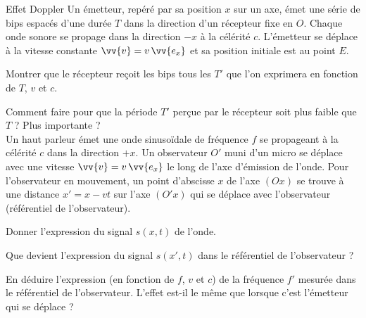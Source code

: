 \begin{exo}[PCSI]{Effet Doppler}
Un émetteur, repéré par sa position $x$ sur un axe, émet une série de bips espacés d'une durée $T$ dans la direction d'un récepteur fixe en $O$. Chaque onde sonore se propage dans la direction $-x$ à la célérité $c$. L'émetteur se déplace à la vitesse constante $\vv{v}=v\,\vv{e_x}$ et sa position initiale est au point $E$.
\begin{quest}
\item Montrer que le récepteur reçoit les bips tous les $T'$ que l'on exprimera en fonction de $T$, $v$ et $c$.

\item Comment faire pour que la période $T'$ perçue par le récepteur soit plus faible que $T$ ? Plus importante ?\\

Un haut parleur émet une onde sinusoïdale de fréquence $f$ se propageant à la célérité $c$ dans la direction $+x$. Un observateur $O'$ muni d'un micro se déplace avec une vitesse $\vv{v}=v\,\vv{e_x}$ le long de l'axe d'émission de l'onde. Pour l'observateur en mouvement, un point d'abscisse $x$ de l'axe $(Ox)$ se trouve à une distance $x'=x-vt$ sur l'axe $(O'x)$ qui se déplace avec l'observateur (référentiel de l'observateur).
\item Donner l'expression du signal $s(x,t)$ de l'onde.

\item Que devient l'expression du signal $s(x',t)$ dans le référentiel de l'observateur ?

\item En déduire l'expression (en fonction de $f$, $v$ et $c$) de la fréquence $f'$ mesurée dans le référentiel de l'observateur. L'effet est-il le même que lorsque c'est l'émetteur qui se déplace ?

\end{quest}
\end{exo}

